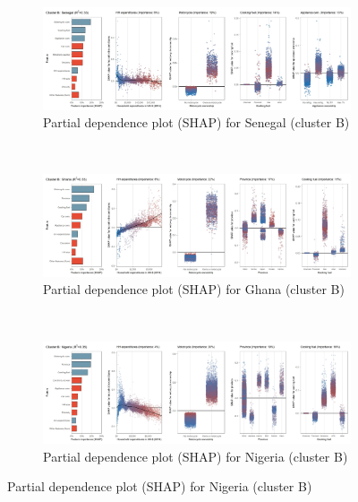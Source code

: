 \begin{figure}[ht!]\ContinuedFloat
    \centering
   \begin{subfigure}[b]{\textwidth}
         \centering
         \caption{Partial dependence plot (SHAP) for Senegal (cluster B)}
         \label{fig:5b_SEN}
         \includegraphics[width=\textwidth]{Figure 5b/Figure_5b_SEN}         
     \end{subfigure}
    \\
    \vspace{0.5cm}
   \begin{subfigure}[b]{\textwidth}
         \centering
         \caption{Partial dependence plot (SHAP) for Ghana (cluster B)}
         \label{fig:5b_GHA}
         \includegraphics[width=\textwidth]{Figure 5b/Figure_5b_GHA}         
     \end{subfigure}
    \\
    \vspace{0.5cm}
   \begin{subfigure}[b]{\textwidth}
         \centering
         \caption{Partial dependence plot (SHAP) for Nigeria (cluster B)}
         \label{fig:5b_NGA}
         \includegraphics[width=\textwidth]{Figure 5b/Figure_5b_NGA}

\end{subfigure}
\end{figure}
